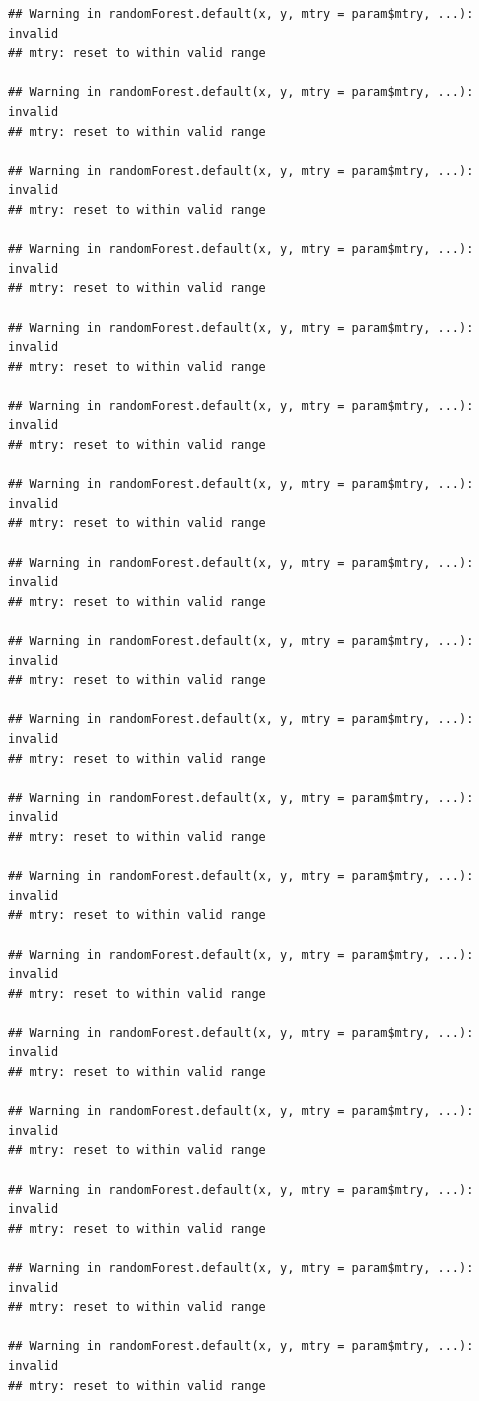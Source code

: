 \documentclass[]{article}
\begin{document}
\begin{verbatim}
## Warning in randomForest.default(x, y, mtry = param$mtry, ...): invalid
## mtry: reset to within valid range

## Warning in randomForest.default(x, y, mtry = param$mtry, ...): invalid
## mtry: reset to within valid range

## Warning in randomForest.default(x, y, mtry = param$mtry, ...): invalid
## mtry: reset to within valid range

## Warning in randomForest.default(x, y, mtry = param$mtry, ...): invalid
## mtry: reset to within valid range

## Warning in randomForest.default(x, y, mtry = param$mtry, ...): invalid
## mtry: reset to within valid range

## Warning in randomForest.default(x, y, mtry = param$mtry, ...): invalid
## mtry: reset to within valid range

## Warning in randomForest.default(x, y, mtry = param$mtry, ...): invalid
## mtry: reset to within valid range

## Warning in randomForest.default(x, y, mtry = param$mtry, ...): invalid
## mtry: reset to within valid range

## Warning in randomForest.default(x, y, mtry = param$mtry, ...): invalid
## mtry: reset to within valid range

## Warning in randomForest.default(x, y, mtry = param$mtry, ...): invalid
## mtry: reset to within valid range

## Warning in randomForest.default(x, y, mtry = param$mtry, ...): invalid
## mtry: reset to within valid range

## Warning in randomForest.default(x, y, mtry = param$mtry, ...): invalid
## mtry: reset to within valid range

## Warning in randomForest.default(x, y, mtry = param$mtry, ...): invalid
## mtry: reset to within valid range

## Warning in randomForest.default(x, y, mtry = param$mtry, ...): invalid
## mtry: reset to within valid range

## Warning in randomForest.default(x, y, mtry = param$mtry, ...): invalid
## mtry: reset to within valid range

## Warning in randomForest.default(x, y, mtry = param$mtry, ...): invalid
## mtry: reset to within valid range

## Warning in randomForest.default(x, y, mtry = param$mtry, ...): invalid
## mtry: reset to within valid range

## Warning in randomForest.default(x, y, mtry = param$mtry, ...): invalid
## mtry: reset to within valid range


\end{verbatim}
\end{document}
